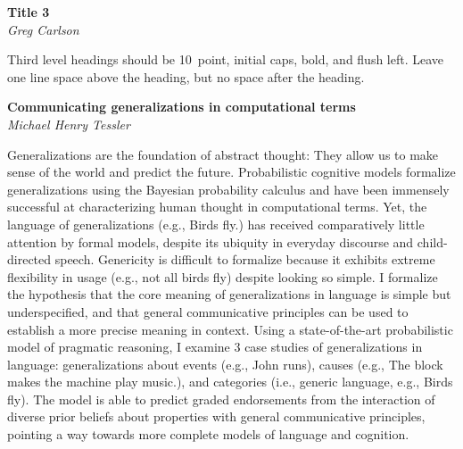 \documentclass[10pt,letterpaper]{article}
\begin{document}
\noindent\textbf{Title 3} \\
\noindent\emph{Greg Carlson}

Third level headings should be 10~point, initial caps, bold, and flush
left. Leave one line space above the heading, but no space after the
heading.


\noindent\textbf{Communicating generalizations in computational terms} \\
\noindent\emph{Michael Henry Tessler}

Generalizations are the foundation of abstract thought: They allow us to make sense of the world and predict the future. Probabilistic cognitive models formalize generalizations using the Bayesian probability calculus and have been immensely successful at characterizing human thought in computational terms. Yet, the language of generalizations (e.g., Birds fly.) has received comparatively little attention by formal models, despite its ubiquity in everyday discourse and child-directed speech. Genericity is difficult to formalize because it exhibits extreme flexibility in usage (e.g., not all birds fly) despite looking so simple. I formalize the hypothesis that the core meaning of generalizations in language is simple but underspecified, and that general communicative principles can be used to establish a more precise meaning in context. Using a state-of-the-art probabilistic model of pragmatic reasoning, I examine 3 case studies of generalizations in language: generalizations about events (e.g., John runs), causes (e.g., The block makes the machine play music.), and categories (i.e., generic language, e.g., Birds fly). The model is able to predict graded endorsements from the interaction of diverse prior beliefs about properties with general communicative principles, pointing a way towards more complete models of language and cognition.



\setlength{\bibleftmargin}{.125in}
\setlength{\bibindent}{-\bibleftmargin}


\end{document}

